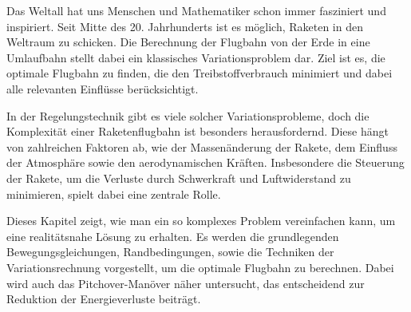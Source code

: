 %
%
%
%
\noindent
Das Weltall hat uns Menschen und Mathematiker schon immer fasziniert und inspiriert. 
Seit Mitte des 20. Jahrhunderts ist es möglich, Raketen in den Weltraum zu schicken. 
Die Berechnung der Flugbahn von der Erde in eine Umlaufbahn stellt dabei ein klassisches Variationsproblem dar. 
%
Ziel ist es, die optimale Flugbahn zu finden, die den Treibstoffverbrauch minimiert und dabei alle relevanten Einflüsse berücksichtigt.
%

In der Regelungstechnik gibt es viele solcher Variationsprobleme,
%
doch die Komplexität einer Raketenflugbahn ist besonders herausfordernd.
Diese hängt von zahlreichen Faktoren ab, wie der Massenänderung der
Rakete, dem Einfluss der Atmosphäre sowie den aerodynamischen
%
%
%
Kräften.
Insbesondere die Steuerung der Rakete, um die Verluste durch
Schwerkraft und Luftwiderstand zu minimieren, spielt dabei eine
%
zentrale Rolle.

Dieses Kapitel zeigt, wie man ein so komplexes Problem vereinfachen
kann, um eine realitätsnahe Lösung zu erhalten.
Es werden die grundlegenden Bewegungsgleichungen, Randbedingungen,
sowie die Techniken der Variationsrechnung vorgestellt, um die
optimale Flugbahn zu berechnen.
Dabei wird auch das Pitchover-Manöver näher untersucht, das
%
entscheidend zur Reduktion der Energieverluste beiträgt.

